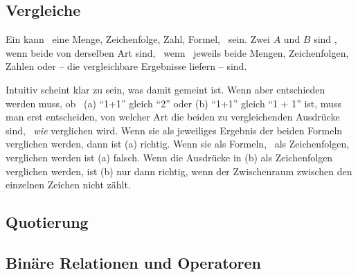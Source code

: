 \subsection{Vergleiche}%
\label{sub:Vergleiche}

Ein \emph{} kann \textzB\ eine Menge, Zeichenfolge, Zahl, Formel, \textusw\ sein.
Zwei  $A$ und $B$ sind \emph{}, wenn beide von derselben Art sind, \textdh\ wenn \textzB\ jeweils beide Mengen, Zeichenfolgen, Zahlen oder  -- die vergleichbare Ergebnisse liefern -- sind.

Intuitiv scheint klar zu sein, was damit  gemeint ist.
Wenn aber entschieden werden muss, ob \textzB\ (a) \enquote{1+1} gleich \enquote{2} oder (b) \enquote{1+1} gleich \enquote{1 + 1} ist, muss man erst entscheiden, von welcher Art die beiden zu vergleichenden Ausdrücke sind, \textdh\ \emph{wie} verglichen wird.
Wenn sie als jeweiliges Ergebnis der beiden Formeln verglichen werden, dann ist (a) richtig.
Wenn sie als Formeln, \textdh\ als Zeichenfolgen, verglichen werden ist (a) falsch.
Wenn die Ausdrücke in (b) als Zeichenfolgen verglichen werden, ist (b) nur dann richtig, wenn der Zwischenraum zwischen den einzelnen Zeichen nicht zählt.

\subsection{Quotierung}%
\label{sub:Quotierung}


\subsection{Binäre Relationen und Operatoren}%
\label{sub:binaer}

